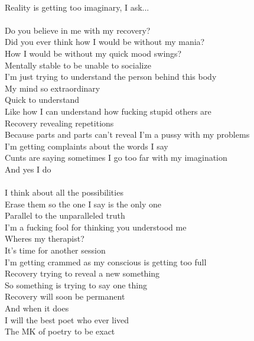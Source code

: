 \documentclass[12pt, b5paper, oneside]{book}
\begin{document}
\\Reality is getting too imaginary, I ask...
%
\\\\Do you believe in me with my recovery?
\\Did you ever think how I would be without my mania?
\\How I would be without my quick mood swings?
\\Mentally stable to be unable to socialize
\\I'm just trying to understand the person behind this body
\\My mind so extraordinary
\\Quick to understand
\\Like how I can understand how fucking stupid others are
\\Recovery revealing repetitions
\\Because parts and parts can't reveal I'm a pussy with my problems
\\I'm getting complaints about the words I say
\\Cunts are saying sometimes I go too far with my imagination
\\And yes I do
%
\\\\I think about all the possibilities
\\Erase them so the one I say is the only one
\\Parallel to the unparalleled truth
\\I'm a fucking fool for thinking you understood me
\\Wheres my therapist?
\\It's time for another session
\\I'm getting crammed as my conscious is getting too full
\\Recovery trying to reveal a new something
\\So something is trying to say one thing
\\Recovery will soon be permanent
\\And when it does
\\I will the best poet who ever lived
\\The MK of poetry to be exact 
\newpage
\end{document}
